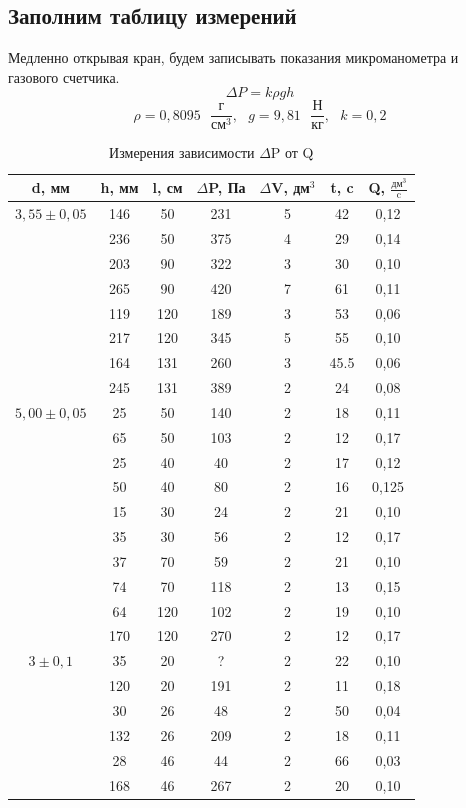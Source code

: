 \documentclass[a4paper]{article}
\begin{document}
	\subsection{Заполним таблицу измерений}
	Медленно открывая кран, будем записывать показания микроманометра и газового счетчика. 
	\begin{equation}
	\Delta P=k\rho gh
	\end{equation}
	\begin{equation}
	\rho=0,8095 \text{ }\frac{\text{г}}{\text{см}^3}, \text{ } g=9,81 \text{ }\frac{\text{Н}}{\text{кг}}, \text{ }k=0,2
	\end{equation}
	\begin{table}[h!]
 		\centering
    	\begin{tabular}{|c|c|c|c|c|c|c|}
    		\hline
    		d, мм & h, мм & l, см & $\Delta$P, Па & $\Delta$V, дм$^3$ & t, c & Q, $\frac{\text{дм}^3}{\text{c}}$ \\
    		\hline
    		$3,55\pm0,05$ & 146 & 50 & 231 & 5 & 42 & 0,12 \\
    			& 236 & 50 & 375 & 4 & 29 & 0,14 \\
    		 	& 203 & 90 & 322 & 3 & 30 & 0,10 \\
    			& 265 & 90 & 420 & 7 & 61 & 0,11 \\
    			& 119 & 120 & 189 & 3 & 53 & 0,06 \\
    			& 217 & 120 & 345 & 5 & 55 & 0,10 \\
    			& 164 & 131 & 260 & 3 & 45.5 & 0,06 \\
    			& 245 & 131 & 389 & 2 & 24 & 0,08 \\
    		\hline
    		$5,00\pm0,05$ & 25 & 50 & 140 & 2 & 18 & 0,11 \\
    			& 65 & 50 & 103 & 2 & 12 & 0,17 \\
    		 	& 25 & 40 & 40 & 2 & 17 & 0,12 \\
    			& 50 & 40 & 80 & 2 & 16 & 0,125 \\
    			& 15 & 30 & 24 & 2 & 21 & 0,10 \\
    			& 35 & 30 & 56 & 2 & 12 & 0,17 \\
    			& 37 & 70 & 59 & 2 & 21 & 0,10 \\
    			& 74 & 70 & 118 & 2 & 13 & 0,15 \\
    			& 64 & 120 & 102 & 2 & 19 & 0,10 \\
    			& 170 & 120 & 270 & 2 & 12 & 0,17 \\
    		\hline
    		$3\pm0,1$ & 35 & 20 & ? & 2 & 22 & 0,10 \\
    			& 120 & 20 & 191 & 2 & 11 & 0,18 \\
    		 	& 30 & 26 & 48 & 2 & 50 & 0,04 \\
    			& 132 & 26 & 209 & 2 & 18 & 0,11 \\
    			& 28 & 46 & 44 & 2 & 66 & 0,03 \\
    			& 168 & 46 & 267 & 2 & 20 & 0,10 \\
    		\hline
    	\end{tabular}
  		\caption{Измерения зависимости $\Delta$P от Q}
	\end{table}
\end{document}
